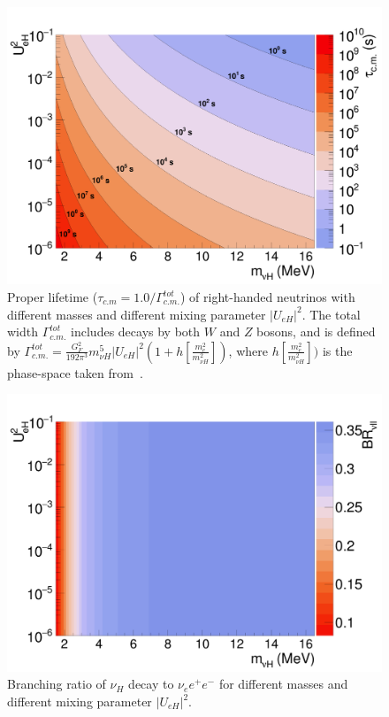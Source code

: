 \documentclass[%
 reprint,
 amsmath,amssymb,
 aps,
 prd,
twocolumn,
]{revtex4-1}
\begin{document}
\begin{figure}[!ht]
\includegraphics[width=0.99\columnwidth]{../plots/RHNTauCM_vs_M_U2_contour_linXlogYlogZ.png}
\caption{Proper lifetime ($\tau_{c.m}=1.0/\Gamma_{c.m.}^{tot}$) of right-handed neutrinos with different masses and different mixing parameter $|U_{eH}|^2$. The total width $\Gamma_{c.m.}^{tot}$ includes decays by both $W$ and $Z$ bosons, and is defined by $\Gamma_{c.m.}^{tot} = \frac{G_F^2}{192\pi^3}m_{\nu H}^5 |U_{eH}|^2 (1 + h\left[\frac{m_e^2}{m_{\nu H}^2}\right])$, where $h\left[\frac{m_e^2}{m_{\nu H}^2}\right])$ is the phase-space taken from~\cite{gorbunov2007TauCM}.}
\label{fig:RHNCTau} 
\end{figure}

\begin{figure}[!ht]
\includegraphics[width=0.99\columnwidth]{../plots/RHNBRvll_vs_M_U2_linXlogYlinZ.png}
\caption{Branching ratio of $\nu_H$ decay to $\nu_e e^+ e^-$ for different masses and different mixing parameter $|U_{eH}|^2$. }
\label{fig:RHNBRvll} 
\end{figure}
\end{document}
